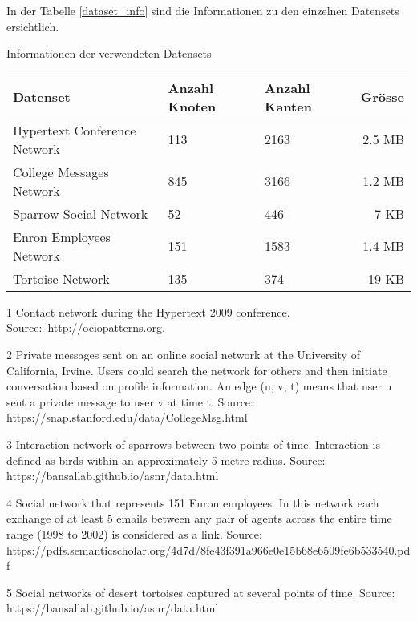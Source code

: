 In der Tabelle \ref{dataset_info} sind die Informationen zu den einzelnen Datensets ersichtlich.

\begin{threeparttable}
    \centering
    \caption{Informationen der verwendeten Datensets}
    \label{dataset_info}
    \begin{tabular}{@{}lllr@{}}
        \toprule
        Datenset                        & Anzahl Knoten & Anzahl Kanten & Grösse \\ \midrule
        Hypertext Conference Network\tnote{1}                 & 113     & 2163 & 2.5 MB   \\
        College Messages Network\tnote{2} & 845    & 3166 & 1.2 MB     \\
        Sparrow Social Network\tnote{3}                 & 52     & 446 & 7 KB   \\
        Enron Employees Network\tnote{4}                 & 151     & 1583 & 1.4 MB   \\
        Tortoise Network\tnote{5}                       & 135   & 374 & 19 KB   \\ \bottomrule
    \end{tabular}
    \begin{tablenotes}[\flushleft]
        \footnotesize
        \item[1] Contact network during the Hypertext 2009 conference. Source: http://ociopatterns.org.
        \item[2] Private messages sent on an online social network at the University of California, Irvine. Users could search the network for others and then initiate conversation based on profile information. An edge (u, v, t) means that user u sent a private message to user v at time t. Source: https://snap.stanford.edu/data/CollegeMsg.html
        \item[3] Interaction network of sparrows between two points of time. Interaction is defined as birds within an approximately 5-metre radius. Source: https://bansallab.github.io/asnr/data.html
        \item[4] Social network that represents 151 Enron employees. In this network each exchange of at least 5 emails between any pair of agents across the entire time range (1998 to 2002) is considered as a link. Source: https://pdfs.semanticscholar.org/4d7d/8fe43f391a966e0e15b68e6509fe6b533540.pdf
        \item[5] Social networks of desert tortoises captured at several points of time. Source: https://bansallab.github.io/asnr/data.html
    \end{tablenotes}
\end{threeparttable}

